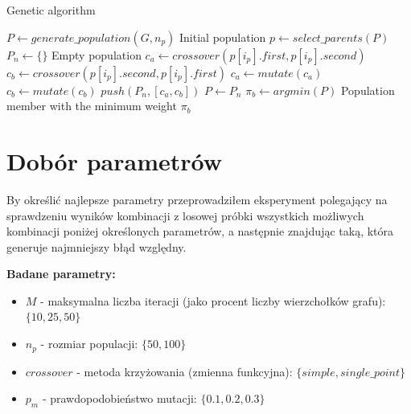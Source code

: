\documentclass[12pt]{article}
\begin{document}
    \newpage

    \begin{algorithm}[h!]
    \caption{Genetic algorithm}\label{alg:genetic_algorithm}
    \begin{algorithmic}[1]
            \State $P \gets generate\_population(G, n_p)$
                \Comment Initial population
            \State
                \State $p \gets select\_parents(P)$
                \State $P_n \gets \{\}$
                    \Comment Empty population
                \State
                    \State $c_a \gets crossover(p[i_p].first, p[i_p].second)$
                    \State $c_b \gets crossover(p[i_p].second, p[i_p].first)$
                        \State $c_a \gets mutate(c_a)$
                    \EndIf
                        \State $c_b \gets mutate(c_b)$
                    \EndIf
                    \State $push(P_n, [c_a, c_b])$
                \EndFor
                \State
                \State $P \gets P_n$
                \State $\pi_b \gets argmin(P)$
                    \Comment Population member with the minimum weight
            \EndFor
            \State
            \Return $\pi_b$
        \EndProcedure
    \end{algorithmic}
    \end{algorithm}

\section*{Dobór parametrów}

    By określić najlepsze parametry przeprowadziłem eksperyment polegający na sprawdzeniu wyników
    kombinacji z losowej próbki wszystkich możliwych kombinacji poniżej określonych parametrów,
    a następnie znajdując taką, która generuje najmniejszy błąd względny.
    \newline

    \noindent \textbf{Badane parametry:}
    \begin{itemize}
        \item $M$ - maksymalna liczba iteracji (jako procent liczby wierzchołków grafu): $\{10, 25, 50\}$
        \item $n_p$ - rozmiar populacji: $\{50, 100\}$
        \item $crossover$ - metoda krzyżowania (zmienna funkcyjna): $\{simple, single\_point\}$
        \item $p_m$ - prawdopodobieństwo mutacji: $\{0.1, 0.2, 0.3\}$
    \end{itemize}
\end{document}
